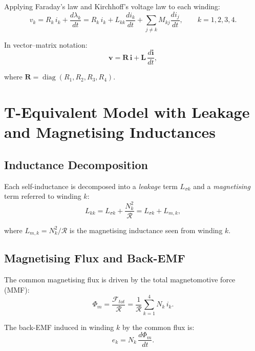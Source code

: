 \documentclass[11pt,a4paper]{article}
\newcommand{\mat}[1]{\mathbf{#1}}
\newcommand{\Rel}{\mathcal{R}}          %
\newcommand{\FMM}{\mathcal{F}}          %
\newcommand{\der}[2]{\dfrac{d#1}{d#2}}
\begin{document}
Applying Faraday's law and Kirchhoff's voltage law to each winding:
\begin{equation}
  \boxed{v_k = R_k\,i_k + \der{\lambda_k}{t}
         = R_k\,i_k + L_{kk}\der{i_k}{t}
           + \sum_{j \neq k} M_{kj}\der{i_j}{t}},
  \qquad k=1,2,3,4.
  \label{eq:voltage_scalar}
\end{equation}

In vector–matrix notation:
\begin{equation}
  \mathbf{v} = \mat{R}\,\mathbf{i} + \mat{L}\,\der{\mathbf{i}}{t},
  \label{eq:voltage_matrix}
\end{equation}

where $\mat{R} = \operatorname{diag}(R_1, R_2, R_3, R_4)$.

\section{T-Equivalent Model with Leakage and Magnetising Inductances}

\subsection{Inductance Decomposition}

Each self-inductance is decomposed into a \emph{leakage} term $L_{\sigma k}$
and a \emph{magnetising} term referred to winding $k$:
\begin{equation}
  L_{kk} = L_{\sigma k} + \frac{N_k^2}{\Rel} = L_{\sigma k} + L_{m,k},
  \label{eq:decomp}
\end{equation}

where $L_{m,k} = N_k^2/\Rel$ is the magnetising inductance seen from winding $k$.

\subsection{Magnetising Flux and Back-EMF}

The common magnetising flux is driven by the total magnetomotive force (MMF):
\begin{equation}
  \Phi_m = \frac{\FMM_{tot}}{\Rel}
           = \frac{1}{\Rel}\sum_{k=1}^{4} N_k\,i_k.
  \label{eq:flux_core}
\end{equation}

The back-EMF induced in winding $k$ by the common flux is:
\begin{equation}
  e_k = N_k\,\der{\Phi_m}{t}.
  \label{eq:emf}
\end{equation}
\end{document}
